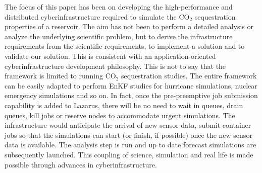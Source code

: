 \documentclass{acm_proc_article-sp}
\newcommand{\yyenote}[1]{ {\textcolor{blue} { ***yye00: #1 }}}
\newcommand{\yyenote}[1]{}
\begin{document}
The focus of this paper has been on developing the high-performance
and distributed cyberinfrastructure required to simulate the CO$_2$
sequestration properties of a reservoir. The aim has not been to
perform a detailed analysis or analyze the underlying scientific
problem, but to derive the infrastructure requirements from the
scientific requirements, to implement a solution and to validate our
solution. This is consistent with an application-oriented
cyberinfrastructure development philosophy. This is not to say
that the framework is limited to running CO$_2$ sequestration studies.
The entire framework can be easily adapted to perform EnKF
studies for hurricane simulations, nuclear emergency simulations 
and so on. In fact, once the pre-preemptive job submission
capability is added to Lazarus, there will be no need
to wait in queues, drain queues, kill jobs or reserve nodes to accommodate urgent
simulations. The infrastructure would anticipate the arrival of
new sensor data, submit container jobs so that the simulations
can start (or finish, if possible) once the new sensor data is available.
The analysis step is run and up to date forecast simulations are subsequently launched.
This coupling of science, simulation and real life is made
possible through advances in cyberinfrastructure.




%


\end{document}
